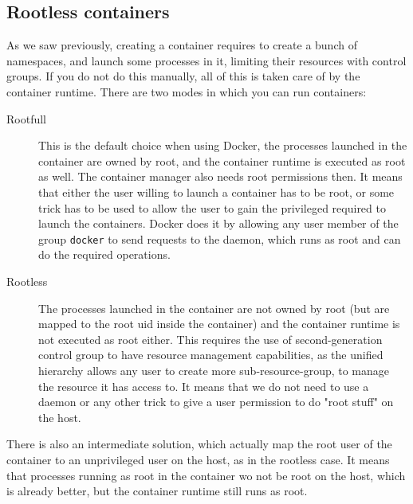 \subsection{Rootless containers}
As we saw previously, creating a container requires to create a bunch of namespaces, and launch some processes in it, limiting their resources with control groups.  If you do not do this manually, all of this is taken care of by the container runtime.  There are two modes in which you can run containers:
\begin{description}
  \item[Rootfull]  This is the default choice when using Docker, the processes launched in the container are owned by root, and the container runtime is executed as root as well.  The container manager also needs root permissions then.  It means that either the user willing to launch a container has to be root, or some trick has to be used to allow the user to gain the privileged required to launch the containers.  Docker does it by allowing any user member of the group \texttt{docker} to send requests to the daemon, which runs as root and can do the required operations.
  \item[Rootless] The processes launched in the container are not owned by root (but are mapped to the root uid inside the container) and the container runtime is not executed as root either.  This requires the use of second-generation control group to have resource management capabilities, as the unified hierarchy allows any user to create more sub-resource-group, to manage the resource it has access to.  It means that we do not need to use a daemon or any other trick to give a user permission to do "root stuff" on the host.
\end{description}
There is also an intermediate solution, which actually map the root user of the container to an unprivileged user on the host, as in the rootless case.  It means that processes running as root in the container wo not be root on the host, which is already better, but the container runtime still runs as root.

